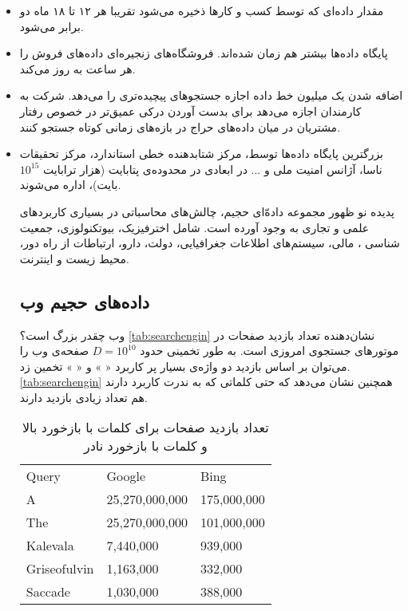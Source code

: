 \begin{itemize}
\item
مقدار داده‌ای که توسط کسب و کارها ذخیره می‌شود تقریبا هر ۱۲ تا ۱۸ ماه دو برابر می‌شود.
\item
پایگاه داده‌ها بیشتر هم ‌زمان شده‌اند. فروشگاه‌های زنجیره‌ای 
داده‌های فروش را هر ساعت به روز می‌کند.
\item
اضافه شدن یک میلیون خط داده اجازه جستجوهای پیچیده‌تری را می‌دهد. شرکت 
به کارمندان اجازه می‌دهد برای بدست آوردن درکی عمیق‌تر در خصوص رفتار مشتریان در میان داده‌های حراج در بازه‌های زمانی کوتاه جستجو کنند.
\item
بزرگترین پایگاه داده‌ها توسط، مرکز شتابدهنده خطی استاندارد، مرکز تحقیقات ناسا، آژانس امنیت ملی و ... در ابعادی در محدوده‌ی پتابایت (هزار ترابایت 
$10^15$
بایت)، اداره می‌شوند.

پدیده نو ظهور مجموعه‌ داده‌ّای حجیم، چالش‌های محاسباتی در بسیاری کاربردهای علمی و تجاری به وجود آورده است. شامل اخترفیزیک، بیوتکنولوزی، جمعیت شناسی
، مالی، سیستم‌های اطلاعات جغرافیایی، دولت، دارو، ارتباطات از راه دور، محیط زیست و اینترنت.

\subsection{داده‌های حجیم وب}

وب چقدر بزرگ است؟  
\autoref{tab:searchengin}
نشان‌دهنده تعداد بازدید صفحات در موتورهای جستجوی امروزی است. به طور تخمینی حدود 
$D = 10^10$
صفحه‌ی وب را می‌توان بر اساس بازدید دو واژه‌ی بسیار پر کاربرد «
» و «
» تخمین زد. 
\autoref{tab:searchengin}
 همچنین نشان می‌دهد که حتی کلماتی که به ندرت کاربرد دارند هم تعداد زیادی بازدید دارند.

\begin{table}[h]
\centering
\begin{latin}
\begin{tabular}{lll}
\hline
Query        & Google         & Bing        \\ \hhline{===}
A            & 25,270,000,000 & 175,000,000 \\
The          & 25,270,000,000 & 101,000,000 \\
Kalevala     & 7,440,000      & 939,000     \\
Griseofulvin & 1,163,000      & 332,000     \\
Saccade      & 1,030,000      & 388,000     \\
\hline
\end{tabular}
\end{latin}
\caption{
تعداد بازدید صفحات برای کلمات با بازخورد بالا و کلمات با بازخورد نادر
}
\label{tab:searchengin}
\end{table}



\end{itemize}
